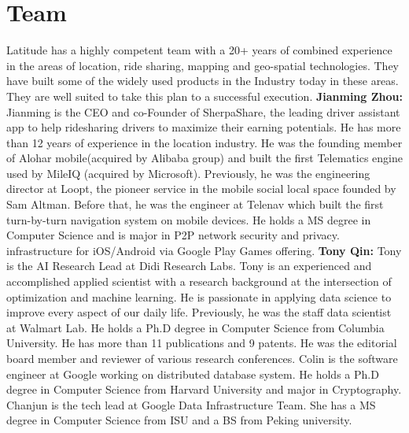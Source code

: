 \section{Team}

Latitude has a highly competent team with a 20+ years of combined experience in the areas of location, ride sharing, mapping and
geo-spatial technologies. They have built some of the widely used products in the Industry today in these areas. They are well suited to take this plan to a successful execution.
\newline
\newline
\noindent
{\bf Jianming Zhou:}
Jianming is the CEO and co-Founder of SherpaShare, the leading driver assistant app to help ridesharing drivers to maximize their earning potentials. He has more than 12 years of experience in the location industry. He was the founding member of Alohar mobile(acquired by Alibaba group) and built the first Telematics engine used by MileIQ (acquired by Microsoft). Previously, he was the engineering director at Loopt, the pioneer service in the mobile social local space founded by Sam Altman. Before that, he was the engineer at Telenav which built the first turn-by-turn navigation system on mobile devices. He holds a MS degree in Computer Science and is major in P2P network security and privacy. 
infrastructure for iOS/Android via Google Play Games offering.
\newline
\newline
\noindent
{\bf Tony Qin:}
Tony is the AI Research Lead at Didi Research Labs. Tony is an experienced and accomplished applied scientist with a research background at the intersection of optimization and machine learning. He is passionate in applying data science to improve every aspect of our daily life. Previously, he was the staff data scientist at Walmart Lab. He holds a Ph.D degree in Computer Science from Columbia University. He has more than 11 publications and 9 patents. He was the editorial board member and reviewer of various research conferences.
\newline
\newline
{} Colin is the software engineer at Google working on distributed database system. He
holds a Ph.D degree in Computer Science from Harvard University and major in Cryptography.
\newline
\newline
{} Chanjun is the tech lead at Google Data Infrastructure Team. She has a MS degree in
Computer Science from ISU and a BS from Peking university. 
